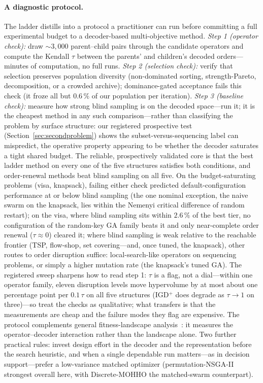 \documentclass[runningheads]{llncs}
\begin{document}
\paragraph{A diagnostic protocol.}
The ladder distills into a protocol a practitioner can run before committing a full experimental budget to a decoder-based multi-objective method. \emph{Step 1 (operator check):} draw ${\sim}3{,}000$ parent--child pairs through the candidate operators and compute the Kendall $\tau$ between the parents' and children's decoded orders---minutes of computation, no full runs. \emph{Step 2 (selection check):} verify that selection preserves population diversity (non-dominated sorting, strength-Pareto, decomposition, or a crowded archive); dominance-gated acceptance fails this check (it froze all but $0.6\,\%$ of our population per iteration). \emph{Step 3 (baseline check):} measure how strong blind sampling is on the decoded space---run it; it is the cheapest method in any such comparison---rather than classifying the problem by surface structure: our registered prospective test (Section~\ref{sec:secondproblem}) shows the subset-versus-sequencing label can mispredict, the operative property appearing to be whether the decoder saturates a tight shared budget. The reliable, prospectively validated core is that the best ladder method on every one of the five structures satisfies both conditions, and order-renewal methods beat blind sampling on all five. On the budget-saturating problems (visa, knapsack), failing either check predicted default-configuration performance at or below blind sampling (the one nominal exception, the naive swarm on the knapsack, lies within the Nemenyi critical difference of random restart); on the visa, where blind sampling sits within $2.6\,\%$ of the best tier, no configuration of the random-key GA family beats it and only near-complete order renewal ($\tau\approx0$) cleared it; where blind sampling is weak relative to the reachable frontier (TSP, flow-shop, set covering---and, once tuned, the knapsack), other routes to order disruption suffice: local-search-like operators on sequencing problems, or simply a higher mutation rate (the knapsack's tuned GA). The registered sweep sharpens how to read step 1: $\tau$ is a flag, not a dial---within one operator family, eleven disruption levels move hypervolume by at most about one percentage point per $0.1\,\tau$ on all five structures (IGD$^{+}$ does degrade as $\tau\to1$ on three)---so treat the checks as qualitative; what transfers is that the measurements are cheap and the failure modes they flag are expensive. The protocol complements general fitness-landscape analysis~\cite{malan}: it measures the operator--decoder interaction rather than the landscape alone. Two further practical rules: invest design effort in the decoder and the representation before the search heuristic, and when a single dependable run matters---as in decision support---prefer a low-variance matched optimizer (permutation-NSGA-II strongest overall here, with Discrete-MOHHO the matched-swarm counterpart).
\end{document}
